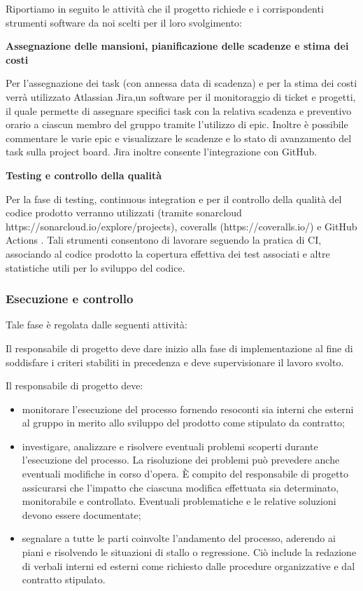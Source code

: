Riportiamo in seguito le attività che il progetto richiede e i corrispondenti strumenti software da noi scelti per il loro svolgimento:

\textbf{Assegnazione delle mansioni, pianificazione delle scadenze e stima dei costi}

Per l'assegnazione dei task (con annessa data di scadenza) e per la stima dei costi verrà utilizzato  Atlassian Jira,un software per il monitoraggio di ticket e progetti, il quale permette di assegnare specifici task con la relativa scadenza e preventivo orario a ciascun membro del gruppo tramite l'utilizzo di epic. Inoltre è possibile commentare le varie epic e visualizzare le scadenze e lo stato di avanzamento del task sulla project board. Jira inoltre consente l'integrazione con GitHub.

\textbf{Testing e controllo della qualità}

Per la fase di testing, continuous integration e per il controllo della qualità del codice prodotto verranno utilizzati  (tramite sonarcloud https://sonarcloud.io/explore/projects), coveralls (https://coveralls.io/) e GitHub Actions . Tali strumenti consentono di lavorare seguendo la pratica di CI, associando al codice prodotto la copertura effettiva dei test associati e altre  statistiche utili per lo sviluppo del codice.

\subsubsection{Esecuzione e controllo}
Tale fase è regolata dalle seguenti attività:

Il responsabile di progetto deve dare inizio alla fase di implementazione al fine di soddisfare i criteri stabiliti in precedenza e deve supervisionare il lavoro svolto.

Il responsabile di progetto deve:
\begin{itemize}
    \item monitorare l'esecuzione del processo fornendo resoconti sia interni che esterni al gruppo in merito allo sviluppo del prodotto come stipulato da contratto;
    \item investigare, analizzare e risolvere eventuali problemi scoperti durante l'esecuzione del processo. La risoluzione dei problemi può prevedere anche eventuali modifiche in corso d'opera. È compito del responsabile di progetto assicurarsi che l'impatto che ciascuna modifica effettuata sia determinato, monitorabile e controllato. Eventuali problematiche e le relative soluzioni devono essere documentate;
    \item segnalare a tutte le parti coinvolte l'andamento del processo, aderendo ai piani e risolvendo le situazioni di stallo o regressione. Ciò include la redazione di verbali interni ed esterni come richiesto dalle procedure organizzative e dal contratto stipulato.
\end{itemize}

